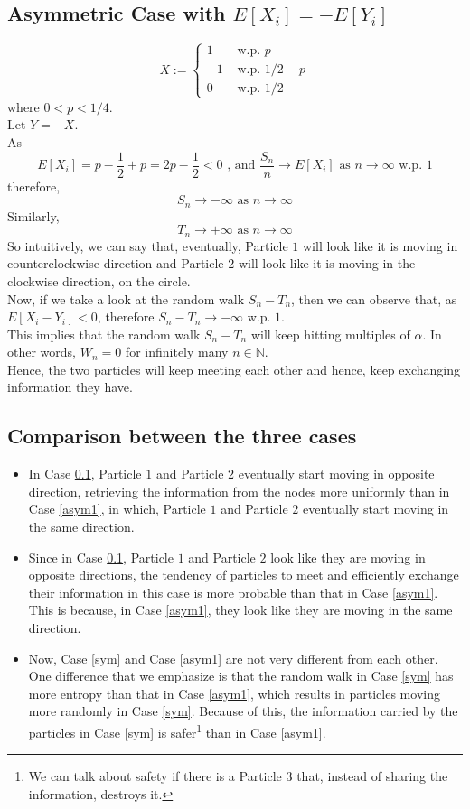 \documentclass[11pt]{article}
\begin{document}
	\subsection{Asymmetric Case with $E[X_i] = -E[Y_i]$}\label{asym2}
	$$X := \begin{cases}
	1 &\text{ w.p. } p\\
	-1 &\text{ w.p. } 1/2 - p\\
	0 &\text{ w.p. } 1/2
	\end{cases}$$
	where $0< p < 1/4$.\\
	Let $Y = -X$.\\[2mm]
	As
	$$E[X_i] =p - \frac{1}{2} + p = 2p - \frac{1}{2}< 0 \text{ , and } \frac{S_n}{n} \to E[X_i] \text{ as } n \to \infty \text{ w.p. } 1$$
	therefore, 
	$$S_n \to -\infty \text{ as } n \to \infty$$
	Similarly, 
	$$T_n \to +\infty \text{ as } n \to \infty$$
	So intuitively, we can say that, eventually, Particle $1$ will look like it is moving in counterclockwise direction and Particle $2$ will look like it is moving in the clockwise direction, on the circle.\\
	Now, if we take a look at the random walk $S_n - T_n$, then we can observe that, as $E[X_i - Y_i] < 0$, therefore $S_n -T_n \to -\infty$ w.p. $1$.\\
	This implies that the random walk $S_n - T_n$ will keep hitting multiples of $\alpha$. In other words, $W_n = 0$ for infinitely many $n \in \mathbb{N}$.\\
	Hence, the two particles will keep meeting each other and hence, keep exchanging information they have.
	
	\subsection{Comparison between the three cases}
	\begin{itemize}
		\item In Case \ref{asym2}, Particle $1$ and Particle $2$ eventually start moving in opposite direction, retrieving the information from the nodes more uniformly than in Case \ref{asym1}, in which, Particle $1$ and Particle $2$ eventually start moving in the same direction.
		\item Since in Case \ref{asym2}, Particle $1$ and Particle $2$ look like they are moving in opposite directions, the tendency of particles to meet and efficiently exchange their information in this case is more probable than that in Case \ref{asym1}. This is because, in Case \ref{asym1}, they look like they are moving in the same direction.
		\item Now, Case \ref{sym} and Case \ref{asym1} are not very different from each other. One difference that we emphasize is that the random walk in Case \ref{sym} has more entropy than that in Case \ref{asym1}, which results in particles moving more randomly in Case \ref{sym}. Because of this, the information carried by the particles in Case \ref{sym} is safer\footnote{We can talk about safety if there is a Particle $3$ that, instead of sharing the information, destroys it.} than in Case \ref{asym1}.
	\end{itemize}
	
\end{document}
